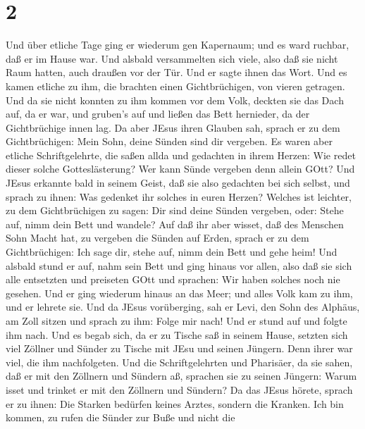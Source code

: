 \hypertarget{section-1}{%
\section{2}\label{section-1}}

 Und über etliche Tage ging er wiederum gen Kapernaum; und
es ward ruchbar, daß er im Hause war.  Und alsbald
versammelten sich viele, also daß sie nicht Raum hatten, auch draußen
vor der Tür. Und er sagte ihnen das Wort.  Und es kamen
etliche zu ihm, die brachten einen Gichtbrüchigen, von vieren getragen.
 Und da sie nicht konnten zu ihm kommen vor dem Volk,
deckten sie das Dach auf, da er war, und gruben's auf und ließen das
Bett hernieder, da der Gichtbrüchige innen lag.  Da aber
JEsus ihren Glauben sah, sprach er zu dem Gichtbrüchigen: Mein Sohn,
deine Sünden sind dir vergeben.  Es waren aber etliche
Schriftgelehrte, die saßen allda und gedachten in ihrem Herzen:
 Wie redet dieser solche Gotteslästerung? Wer kann Sünde
vergeben denn allein GOtt?  Und JEsus erkannte bald in
seinem Geist, daß sie also gedachten bei sich selbst, und sprach zu
ihnen: Was gedenket ihr solches in euren Herzen?  Welches
ist leichter, zu dem Gichtbrüchigen zu sagen: Dir sind deine Sünden
vergeben, oder: Stehe auf, nimm dein Bett und wandele?  Auf
daß ihr aber wisset, daß des Menschen Sohn Macht hat, zu vergeben die
Sünden auf Erden, sprach er zu dem Gichtbrüchigen:  Ich
sage dir, stehe auf, nimm dein Bett und gehe heim!  Und
alsbald stund er auf, nahm sein Bett und ging hinaus vor allen, also daß
sie sich alle entsetzten und preiseten GOtt und sprachen: Wir haben
solches noch nie gesehen.  Und er ging wiederum hinaus an
das Meer; und alles Volk kam zu ihm, und er lehrete sie. 
Und da JEsus vorüberging, sah er Levi, den Sohn des Alphäus, am Zoll
sitzen und sprach zu ihm: Folge mir nach! Und er stund auf und folgte
ihm nach.  Und es begab sich, da er zu Tische saß in seinem
Hause, setzten sich viel Zöllner und Sünder zu Tische mit JEsu und
seinen Jüngern. Denn ihrer war viel, die ihm nachfolgeten. 
Und die Schriftgelehrten und Pharisäer, da sie sahen, daß er mit den
Zöllnern und Sündern aß, sprachen sie zu seinen Jüngern: Warum isset und
trinket er mit den Zöllnern und Sündern?  Da das JEsus
hörete, sprach er zu ihnen: Die Starken bedürfen keines Arztes, sondern
die Kranken. Ich bin kommen, zu rufen die Sünder zur Buße und nicht die
